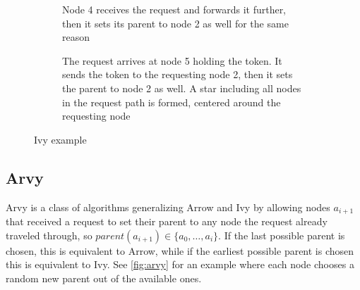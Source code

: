 \documentclass[a4paper, oneside]{discothesis}
\begin{document}
\begin{figure}
\ContinuedFloat
\begin{subfigure}[t]{0.5\textwidth}
\centering
{}
\caption{Node 4 receives the request and forwards it further, then it sets its parent to node 2 as well for the same reason}
\end{subfigure}
\quad
\begin{subfigure}[t]{0.5\textwidth}
\centering
{}
\caption{The request arrives at node 5 holding the token. It sends the token to the requesting node 2, then it sets the parent to node 2 as well. A star including all nodes in the request path is formed, centered around the requesting node}
\end{subfigure}
\caption{Ivy example}
\label{fig:ivy}
\end{figure}

\subsection{Arvy}

Arvy is a class of algorithms generalizing Arrow and Ivy by allowing nodes $a_{i+1}$ that received a request to set their parent to any node the request already traveled through, so $parent(a_{i+1})\in\{a_{0},\dots,a_{i}\}$. If the last possible parent is chosen, this is equivalent to Arrow, while if the earliest possible parent is chosen this is equivalent to Ivy. See \autoref{fig:arvy} for an example where each node chooses a random new parent out of the available ones.
\end{document}
